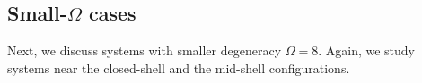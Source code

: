 \documentclass[%
superscriptaddress,
preprint,
showpacs,
nofootinbib,
amsmath,amssymb,
aps,
prc,
floatfix ]%
{revtex4-1}
\begin{document}


\subsection{Small-$\Omega$ cases}

Next, we discuss systems with smaller degeneracy $\Omega=8$.
Again, we study systems near the closed-shell and the mid-shell configurations.
\end{document}
